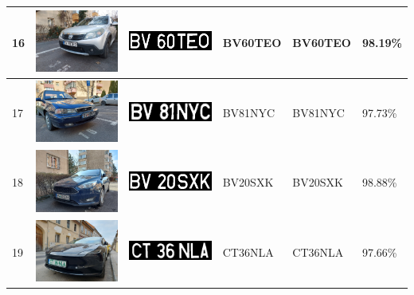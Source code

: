 \documentclass[a4paper,12pt]{report}
\begin{document}
\begin{longtable}{| m{0.6cm} | m{3cm} | m{3cm} | m{1.8cm} | m{1.8cm} | m{1.8cm} |}
    16  & \includegraphics[width=3cm,keepaspectratio]{dataset/7_d2.jpg}   & \includegraphics[width=3cm,keepaspectratio]{segmentari/16.jpg}  & BV60TEO             & BV60TEO              & 98.19\%    \\ \hline
    17  & \includegraphics[width=3cm,keepaspectratio]{dataset/8_s1.jpg}   & \includegraphics[width=3cm,keepaspectratio]{segmentari/17.jpg}  & BV81NYC             & BV81NYC              & 97.73\%    \\ \hline
    18  & \includegraphics[width=3cm,keepaspectratio]{dataset/9_d1.jpg}   & \includegraphics[width=3cm,keepaspectratio]{segmentari/18.jpg}  & BV20SXK             & BV20SXK              & 98.88\%    \\ \hline
    19  & \includegraphics[width=3cm,keepaspectratio]{dataset/10_d1.jpg}  & \includegraphics[width=3cm,keepaspectratio]{segmentari/19.jpg}  & CT36NLA             & CT36NLA              & 97.66\%    \\ \hline

\end{longtable}
\end{document}
